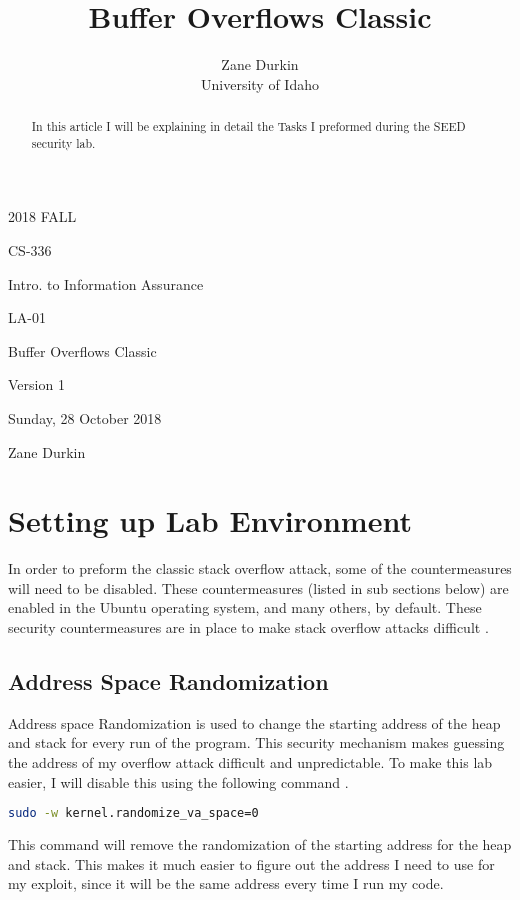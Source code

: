 \documentclass[14pt]{extarticle}
\begin{document}
\title{Buffer Overflows Classic}

\author{Zane Durkin\\
    University of Idaho}
\begin{description}[leftmargin=!, labelwidth=\widthof{\bfseries Author(s) Name(s)}]
\item [Year and Semester] 2018 FALL
\item [Course Number] CS-336
\item [Course Title] Intro. to Information Assurance
\item [Work Number] LA-01
\item [Work Name] Buffer Overflows Classic
\item [Work Version] Version 1
\item [Long Date] Sunday, 28 October 2018
\item [Author(s) Name(s)] Zane Durkin
\end{description}
\begin{abstract}
In this article I will be explaining in detail the Tasks I preformed during the SEED security lab.
\end{abstract}

\setcounter{section}{-1}
\section{Setting up Lab Environment}
In order to preform the classic stack overflow attack, some of the countermeasures will need to be disabled. These countermeasures (listed in sub sections below) are enabled in the Ubuntu operating system, and many others, by default. These security countermeasures are in place to make stack overflow attacks difficult \cite{seed-bof}.

\subsection{Address Space Randomization}
Address space Randomization is used to change the starting address of the heap and stack for every run of the program. This security mechanism makes guessing the address of my overflow attack difficult and unpredictable. To make this lab easier, I will disable this using the following command \cite{seed-bof}.
\begin{lstlisting}[language=sh]
	sudo -w kernel.randomize_va_space=0
\end{lstlisting}
This command will remove the randomization of the starting address for the heap and stack. This makes it much easier to figure out the address I need to use for my exploit, since it will be the same address every time I run my code.
\end{document}

